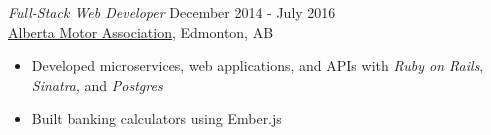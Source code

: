 \documentclass[margin, 10pt]{res} %
\begin{document}
\begin{resume}
{\sl Full-Stack Web Developer} \hfill December 2014 - July 2016 \\
\href{https://ama.ab.ca/}{Alberta Motor Association}, Edmonton, AB
\begin{itemize} 
    \item Developed microservices, web applications, and APIs with {\it Ruby on Rails}, {\it Sinatra}, and {\it Postgres}
    \item Built banking calculators using Ember.js
\end{itemize}




\end{resume}
\end{document}
